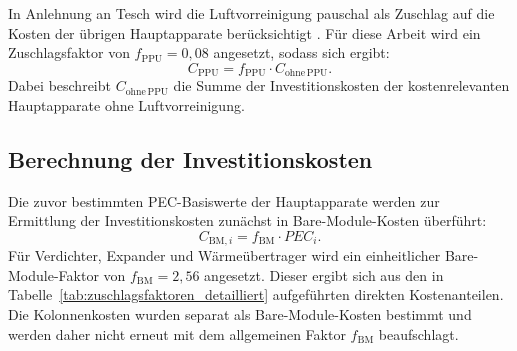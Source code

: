 In Anlehnung an Tesch wird die Luftvorreinigung pauschal als Zuschlag auf die
Kosten der übrigen Hauptapparate berücksichtigt
\cite{teschExergybasedMethodsApplied}. Für diese Arbeit wird ein
Zuschlagsfaktor von $f_\mathrm{PPU}=0{,}08$ angesetzt, sodass sich ergibt:
\begin{equation}
C_\mathrm{PPU}
=
f_\mathrm{PPU}
\cdot
C_\mathrm{ohne\,PPU}.
\end{equation}
Dabei beschreibt $C_\mathrm{ohne\,PPU}$ die Summe der Investitionskosten der
kostenrelevanten Hauptapparate ohne Luftvorreinigung.


\subsection*{Berechnung der Investitionskosten}

Die zuvor bestimmten PEC-Basiswerte der Hauptapparate werden zur Ermittlung der
Investitionskosten zunächst in Bare-Module-Kosten überführt:
\begin{equation}
    C_{\mathrm{BM},i}
    =
    f_{\mathrm{BM}}
    \cdot
    PEC_i .
\end{equation}
Für Verdichter, Expander und Wärmeübertrager wird ein einheitlicher
Bare-Module-Faktor von \(f_{\mathrm{BM}}=2{,}56\) angesetzt. Dieser ergibt sich
aus den in Tabelle~\ref{tab:zuschlagsfaktoren_detailliert} aufgeführten direkten
Kostenanteilen. Die Kolonnenkosten wurden separat als Bare-Module-Kosten
bestimmt und werden daher nicht erneut mit dem allgemeinen Faktor
\(f_{\mathrm{BM}}\) beaufschlagt.

